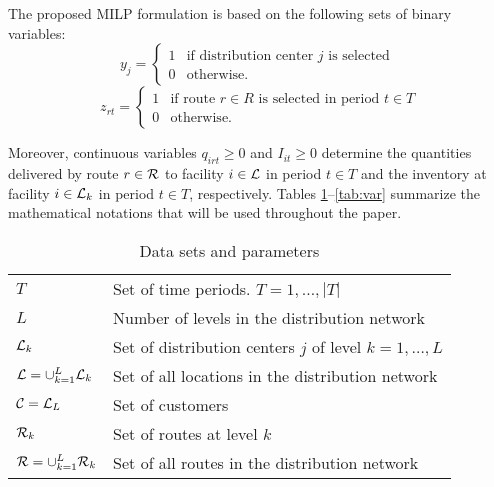 \documentclass[a4paper,10pt]{article}
\begin{document}
\begin{linenumbers}
The proposed MILP formulation is based on the following sets of binary variables: 
$$	y_j  = \left\{
\begin{array}{ll}
1 & \mbox{if distribution center } j \mbox{ is selected }  \\
0 & \mbox{otherwise.}
\end{array}
\right.
$$
$$	z_{rt}  = \left\{
\begin{array}{ll}
1 & \mbox{if route } r \in R \mbox{ is selected in period } t \in T \\
0 & \mbox{otherwise.}
\end{array}
\right.
$$

Moreover, continuous variables $q_{irt} \geq 0$ and $I_{it} \geq 0$  
determine the quantities delivered by route $r \in \mathcal{R}$ to facility $i \in \mathcal{L}$ in period $t\in T$
and the inventory at facility $i \in \mathcal{L}_{k}$ in period $t \in T$, respectively. 
Tables \ref{tab:set}--\ref{tab:var} summarize the mathematical notations that will be used throughout the paper.

\begin{table}[htbp]
	\centering
	\begin{tabular}{ll}
		\toprule
		$T$ & Set of time periods. $T = 1,\dots,|T|$\\
		$L$ & Number of levels in the distribution network\\
		$\mathcal{L}_k$ & Set of distribution centers $j$ of level $k=1, \ldots,L$ \\
		$\mathcal{L}=\cup_{k=1}^L \mathcal{L}_k$ & Set of all locations in the distribution network\\
		$\mathcal{C}=\mathcal{L}_L$ & Set of customers \\ 
		$\mathcal{R}_k$ & Set of routes at level $k$\\
		$\mathcal{R} = \cup_{k=1}^{L} \mathcal{R}_k$ & Set of all routes in the distribution network\\
		\bottomrule
	\end{tabular}
	\caption{Data sets and parameters}
	\label{tab:set}
\end{table}       



\end{linenumbers}
\end{document}
